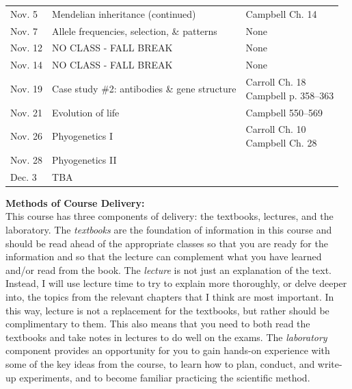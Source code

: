 \documentclass[hidelinks]{article}
\begin{document}
\begin{table}[H]
\begin{tabular}{l p{6cm} p{6cm}}
			Nov. 5 & Mendelian inheritance (continued) & Campbell Ch. 14\\
			\addlinespace
			Nov. 7 & Allele frequencies, selection, \& patterns & None\\
			\addlinespace
			Nov. 12 & NO CLASS - FALL BREAK & None\\
			\addlinespace
			Nov. 14 & NO CLASS - FALL BREAK & None\\
			\addlinespace
			Nov. 19 & Case study \#2: antibodies \& gene structure & \makecell[tl]{Carroll Ch. 18\\ Campbell p. 358--363}\\
			\addlinespace
			Nov. 21 & Evolution of life & Campbell 550--569\\
			\addlinespace
			Nov. 26 & Phyogenetics I & \makecell[tl]{Carroll Ch. 10\\ Campbell Ch. 28}\\
			\addlinespace
			Nov. 28 & Phyogenetics II &\\
			\addlinespace
			Dec. 3 & TBA &\\
			\bottomrule
		\end{tabular}
	\end{table}	


	\newpage
	\textbf{Methods of Course Delivery:}\\
	This course has three components of delivery: the textbooks, lectures, and the laboratory. The \emph{textbooks} are the foundation of information in this course and should be read ahead of the appropriate classes so that you are ready for the information and so that the lecture can complement what you have learned and/or read from the book. The \emph{lecture} is not just an explanation of the text. Instead, I will use lecture time to try to explain more thoroughly, or delve deeper into, the topics from the relevant chapters that I think are most important. In this way, lecture is not a replacement for the textbooks, but rather should be complimentary to them. This also means that you need to both read the textbooks and take notes in lectures to do well on the exams. The \emph{laboratory} component provides an opportunity for you to gain hands-on experience with some of the key ideas from the course, to learn how to plan, conduct, and write-up experiments, and to become familiar practicing the scientific method.
	 

\vspace{0.3cm}
\end{document}
